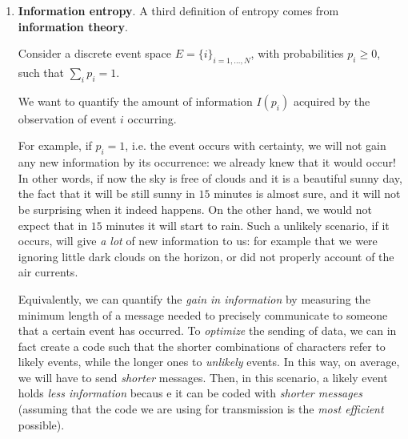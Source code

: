 \documentclass[../template.tex]{subfiles}
\begin{document}
\begin{enumerate}
    \item \textbf{Information entropy}.  
    A third definition of entropy comes from \textbf{information theory}.

    Consider a discrete event space $E = \{i\}_{i=1,\dots, N}$, with probabilities $p_i \geq 0$, such that $\sum_i p_i = 1$.

    We want to quantify the amount of information $I(p_i)$ acquired by the observation of event $i$ occurring. 

    For example, if $p_i=1$, i.e. the event occurs with certainty, we will not gain any new information by its occurrence: we already knew that it would occur! In other words, if now the sky is free of clouds and it is a beautiful sunny day, the fact that it will be still sunny in $15$ minutes is almost sure, and it will not be surprising when it indeed happens. On the other hand, we would not expect that in $15$ minutes it will start to rain. Such a unlikely scenario, if it occurs, will give \textit{a lot} of new information to us: for example that we were ignoring little dark clouds on the horizon, or did not properly account of the air currents.  

    Equivalently, we can quantify the \textit{gain in information} by measuring the minimum length of a message needed to precisely communicate to someone that a certain event has occurred. To \textit{optimize} the sending of data, we can in fact create a code such that the shorter combinations of characters refer to likely events, while the longer ones to \textit{unlikely} events. In this way, on average, we will have to send \textit{shorter} messages. Then, in this scenario, a likely event holds \textit{less information} becaus e it can be coded with \textit{shorter messages} (assuming that the code we are using for transmission is the \textit{most efficient} possible).

    \medskip


\end{enumerate}
\end{document}

